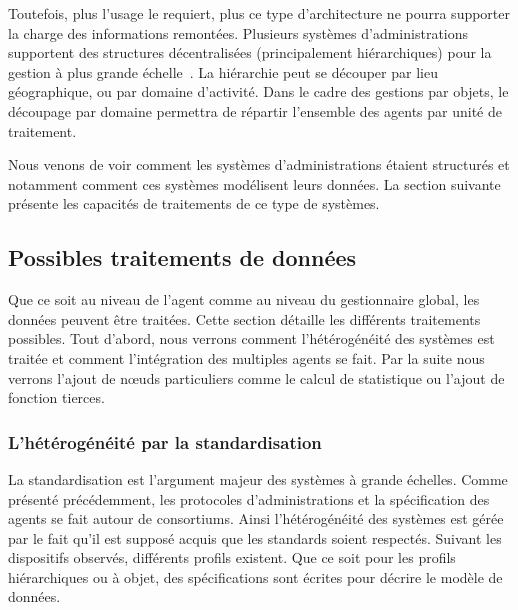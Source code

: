 Toutefois, plus l'usage le requiert, plus ce type d'architecture ne pourra supporter la charge des informations remontées. Plusieurs systèmes d'administrations supportent des structures décentralisées (principalement hiérarchiques) pour la gestion à plus grande échelle~\cite{Kessis:management}. La hiérarchie peut se découper par lieu géographique, ou par domaine d'activité. Dans le cadre des gestions par objets, le découpage par domaine permettra de répartir l'ensemble des agents par unité de traitement.

Nous venons de voir comment les systèmes d'administrations étaient structurés et notamment comment ces systèmes modélisent leurs données. La section suivante présente les capacités de traitements de ce type de systèmes.

\subsection{Possibles traitements de données}
Que ce soit au niveau de l'agent comme au niveau du gestionnaire global, les données peuvent être traitées. Cette section détaille les différents traitements possibles. Tout d'abord, nous verrons comment l'hétérogénéité des systèmes est traitée et comment l'intégration des multiples agents se fait. Par la suite nous verrons l'ajout de nœuds particuliers comme le calcul de statistique ou l'ajout de fonction tierces.

\subsubsection{L'hétérogénéité par la standardisation}
La standardisation est l'argument majeur des systèmes à grande échelles. Comme présenté précédemment, les protocoles d'administrations et la spécification des agents se fait autour de consortiums. Ainsi l'hétérogénéité des systèmes est gérée par le fait qu'il est supposé acquis que les standards soient respectés. Suivant les dispositifs observés, différents profils existent. Que ce soit pour les profils hiérarchiques ou à objet, des spécifications sont écrites pour décrire le modèle de données.


